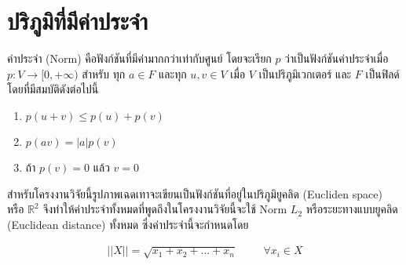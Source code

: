 \section{ปริภูมิที่มีค่าประจำ}



\hspace{1cm} ค่าประจำ (Norm) คือฟังก์ชันที่มีค่ามากกว่าเท่ากับศูนย์ โดยจะเรียก $p$ ว่าเป็นฟังก์ชันค่าประจำเมื่อ \\$p : V \rightarrow [0,+\infty)$ สำหรับ ทุก $a \in F$  และทุก $u, v \in V$ เมื่อ $V$ เป็นปริภูมิเวกเตอร์ และ $F$ เป็นฟิลด์ โดยที่มีสมบัติดังต่อไปนี้
\begin{enumerate}
    \item $p(u + v) \leq p(u) + p(v)$
    \item $p(av) = |a| p(v)$ 
    \item ถ้า $p(v) = 0$ แล้ว $v=0$ 
\end{enumerate}

\hspace{1cm} สำหรับโครงงานวิจัยนี้รูปภาพเฉดเทาจะเขียนเป็นฟังก์ชันที่อยู่ในปริภูมิยูคลิด (Eucliden space) หรือ $\mathbb{R}^2$ จึงทำให้ค่าประจำทั้งหมดที่พูดถึงในโครงงานวิจัยนี้จะใช้ Norm $L_2$ หรือระยะทางแบบยูคลิด (Euclidean distance) ทั้งหมด ซึ่งค่าประจำนี้จะกำหนดโดย

\begin{align*}
    || X || = \sqrt{x_1 + x_2 + ... + x_n} \hspace{1cm} \forall x_i \in X
\end{align*}